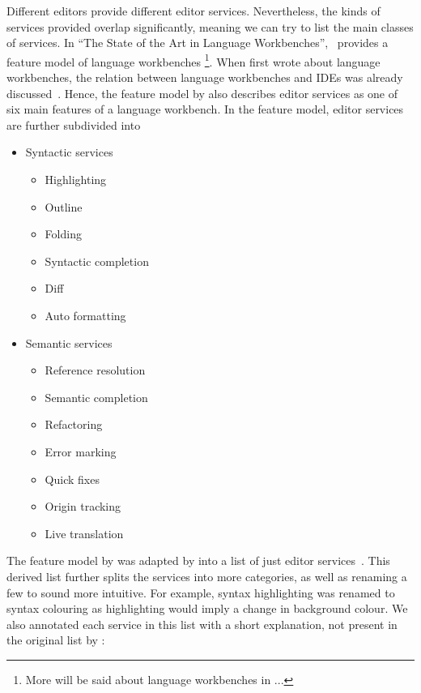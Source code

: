 Different editors provide different editor services.
Nevertheless, the kinds of services provided overlap significantly, meaning we can try to list the main classes of services.
In ``The State of the Art in Language Workbenches'',~\autocite{ErdwegSV13} provides a feature model of language workbenches
\footnote{More will be said about language workbenches in ...}.
When \citeauthor{Fowler2004} first wrote about language workbenches, the relation between language workbenches and \acp{IDE} was already discussed~\autocite{Fowler2004}.
Hence, the feature model by \citeauthor{ErdwegSV13} also describes editor services as one of six main features of a language workbench.
In the feature model, editor services are further subdivided into

\begin{itemize}
    \item Syntactic services
    \begin{itemize}
        \item Highlighting
        \item Outline
        \item Folding
        \item Syntactic completion
        \item Diff
        \item Auto formatting
    \end{itemize}
    \item Semantic services
    \begin{itemize}
        \item Reference resolution
        \item Semantic completion
        \item Refactoring
        \item Error marking
        \item Quick fixes
        \item Origin tracking
        \item Live translation
    \end{itemize}
\end{itemize}

The feature model by \citeauthor{ErdwegSV13} was adapted by \citeauthor{Pelsmaeker2018} into a list of just editor services~\autocite{Pelsmaeker2018}.
This derived list further splits the services into more categories, as well as renaming a few to sound more intuitive.
For example, syntax highlighting was renamed to syntax colouring as highlighting would imply a change in background colour.
We also annotated each service in this list with a short explanation, not present in the original list by \citeauthor{Pelsmaeker2018}:

